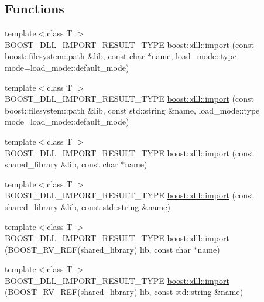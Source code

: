 \subsection*{Functions}
\begin{DoxyCompactItemize}
\item 
{\footnotesize template$<$class T $>$ }\\B\+O\+O\+S\+T\+\_\+\+D\+L\+L\+\_\+\+I\+M\+P\+O\+R\+T\+\_\+\+R\+E\+S\+U\+L\+T\+\_\+\+T\+Y\+PE \hyperlink{a00570_ade82cd3690b6f9f21ce1f92563c04694}{boost\+::dll\+::import} (const boost\+::filesystem\+::path \&lib, const char $\ast$name, load\+\_\+mode\+::type mode=load\+\_\+mode\+::default\+\_\+mode)
\item 
{\footnotesize template$<$class T $>$ }\\B\+O\+O\+S\+T\+\_\+\+D\+L\+L\+\_\+\+I\+M\+P\+O\+R\+T\+\_\+\+R\+E\+S\+U\+L\+T\+\_\+\+T\+Y\+PE \hyperlink{a00570_aabe8a061e53eb6ec4ea80ff5eb7a9c29}{boost\+::dll\+::import} (const boost\+::filesystem\+::path \&lib, const std\+::string \&name, load\+\_\+mode\+::type mode=load\+\_\+mode\+::default\+\_\+mode)
\item 
{\footnotesize template$<$class T $>$ }\\B\+O\+O\+S\+T\+\_\+\+D\+L\+L\+\_\+\+I\+M\+P\+O\+R\+T\+\_\+\+R\+E\+S\+U\+L\+T\+\_\+\+T\+Y\+PE \hyperlink{a00570_a1feb1943049297f6177c9e80d1f96202}{boost\+::dll\+::import} (const shared\+\_\+library \&lib, const char $\ast$name)
\item 
{\footnotesize template$<$class T $>$ }\\B\+O\+O\+S\+T\+\_\+\+D\+L\+L\+\_\+\+I\+M\+P\+O\+R\+T\+\_\+\+R\+E\+S\+U\+L\+T\+\_\+\+T\+Y\+PE \hyperlink{a00570_a7697764076cbe4d8e7705b2a4710c76f}{boost\+::dll\+::import} (const shared\+\_\+library \&lib, const std\+::string \&name)
\item 
{\footnotesize template$<$class T $>$ }\\B\+O\+O\+S\+T\+\_\+\+D\+L\+L\+\_\+\+I\+M\+P\+O\+R\+T\+\_\+\+R\+E\+S\+U\+L\+T\+\_\+\+T\+Y\+PE \hyperlink{a00570_a6008e873f45aa7cc22b8d556670a6b85}{boost\+::dll\+::import} (B\+O\+O\+S\+T\+\_\+\+R\+V\+\_\+\+R\+EF(shared\+\_\+library) lib, const char $\ast$name)
\item 
{\footnotesize template$<$class T $>$ }\\B\+O\+O\+S\+T\+\_\+\+D\+L\+L\+\_\+\+I\+M\+P\+O\+R\+T\+\_\+\+R\+E\+S\+U\+L\+T\+\_\+\+T\+Y\+PE \hyperlink{a00570_a3a30149253feebe550a411593bfb90b5}{boost\+::dll\+::import} (B\+O\+O\+S\+T\+\_\+\+R\+V\+\_\+\+R\+EF(shared\+\_\+library) lib, const std\+::string \&name)

\end{DoxyCompactItemize}
